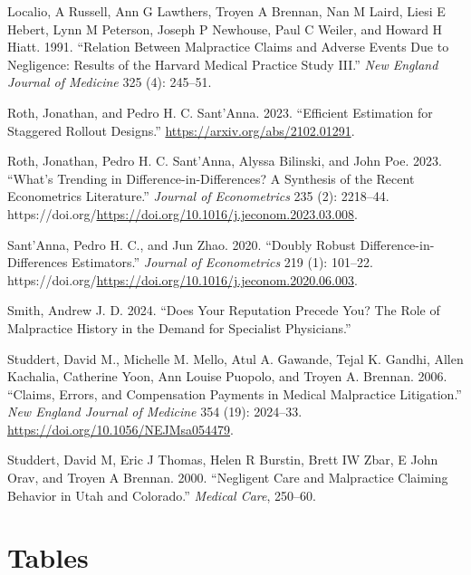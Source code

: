 \documentclass[
  12pt,
]{article}
\newlength{\cslhangindent}
\newlength{\cslentryspacingunit} %
\newenvironment{CSLReferences}[2] %
 {%
  \setlength{\parindent}{0pt}
  \ifodd #1
  \let\oldpar\par
  \def\par{\hangindent=\cslhangindent\oldpar}
  \fi
  \setlength{\parskip}{#2\cslentryspacingunit}
 }%
 {}
\begin{document}
\begin{CSLReferences}{1}{0}
\leavevmode{}%
Localio, A Russell, Ann G Lawthers, Troyen A Brennan, Nan M Laird, Liesi E Hebert, Lynn M Peterson, Joseph P Newhouse, Paul C Weiler, and Howard H Hiatt. 1991. {``Relation Between Malpractice Claims and Adverse Events Due to Negligence: Results of the Harvard Medical Practice Study III.''} \emph{New England Journal of Medicine} 325 (4): 245--51.

\leavevmode{}%
Roth, Jonathan, and Pedro H. C. Sant'Anna. 2023. {``Efficient Estimation for Staggered Rollout Designs.''} \url{https://arxiv.org/abs/2102.01291}.

\leavevmode{}%
Roth, Jonathan, Pedro H. C. Sant'Anna, Alyssa Bilinski, and John Poe. 2023. {``What's Trending in Difference-in-Differences? A Synthesis of the Recent Econometrics Literature.''} \emph{Journal of Econometrics} 235 (2): 2218--44. https://doi.org/\url{https://doi.org/10.1016/j.jeconom.2023.03.008}.

\leavevmode{}%
Sant'Anna, Pedro H. C., and Jun Zhao. 2020. {``Doubly Robust Difference-in-Differences Estimators.''} \emph{Journal of Econometrics} 219 (1): 101--22. https://doi.org/\url{https://doi.org/10.1016/j.jeconom.2020.06.003}.

\leavevmode{}%
Smith, Andrew J. D. 2024. {``Does Your Reputation Precede You? The Role of Malpractice History in the Demand for Specialist Physicians.''}

\leavevmode{}%
Studdert, David M., Michelle M. Mello, Atul A. Gawande, Tejal K. Gandhi, Allen Kachalia, Catherine Yoon, Ann Louise Puopolo, and Troyen A. Brennan. 2006. {``Claims, Errors, and Compensation Payments in Medical Malpractice Litigation.''} \emph{New England Journal of Medicine} 354 (19): 2024--33. \url{https://doi.org/10.1056/NEJMsa054479}.

\leavevmode{}%
Studdert, David M, Eric J Thomas, Helen R Burstin, Brett IW Zbar, E John Orav, and Troyen A Brennan. 2000. {``Negligent Care and Malpractice Claiming Behavior in Utah and Colorado.''} \emph{Medical Care}, 250--60.

\end{CSLReferences}

\newpage

\hypertarget{tables}{%
\section{Tables}\label{tables}}
\end{document}

